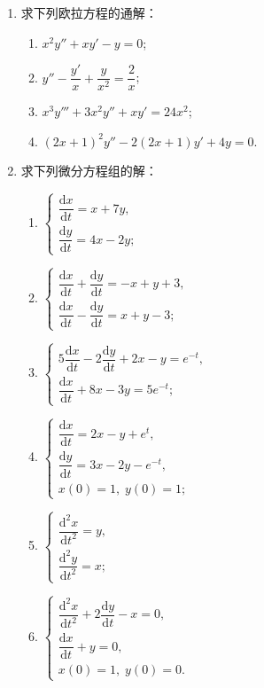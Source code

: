 \begin{enumerate}\setlength{\itemsep}{7pt}
    \item 求下列欧拉方程的通解：
    \begin{enumerate}[(1)]\setlength{\itemsep}{5pt}\setlength{\topsep}{15pt}
        \item $x^2y''+xy'-y=0$;
        \item $y''-\dfrac{y'}{x}+\dfrac{y}{x^2}=\dfrac{2}{x}$;
        \item $x^3y'''+3x^2y''+xy'=24x^2$;
        \item $(2x+1)^2y''-2(2x+1)y'+4y=0$.
    \end{enumerate}

    \item 求下列微分方程组的解：
    \begin{enumerate}[(1)]\setlength{\itemsep}{5pt}\setlength{\topsep}{15pt}
        \item $\begin{cases}
            \dfrac{\text{d}x}{\text{d}t}=x+7y,\\
            \dfrac{\text{d}y}{\text{d}t}=4x-2y;
        \end{cases}$
        \item $\begin{cases}
            \dfrac{\text{d}x}{\text{d}t}+\dfrac{\text{d}y}{\text{d}t}=-x+y+3,\\
            \dfrac{\text{d}x}{\text{d}t}-\dfrac{\text{d}y}{\text{d}t}=x+y-3;
        \end{cases}$
        \item $\begin{cases}
            5\dfrac{\text{d}x}{\text{d}t}-2\dfrac{\text{d}y}{\text{d}t}+2x-y=e^{-t},\\
            \dfrac{\text{d}x}{\text{d}t}+8x-3y=5e^{-t};
        \end{cases}$
        \item $\begin{cases}
            \dfrac{\text{d}x}{\text{d}t}=2x-y+e^t,\\
            \dfrac{\text{d}y}{\text{d}t}=3x-2y-e^{-t},\\
            x(0)=1,\;y(0)=1;
        \end{cases}$
        \item $\begin{cases}
            \dfrac{\text{d}^2x}{\text{d}t^2}=y,\\
            \dfrac{\text{d}^2y}{\text{d}t^2}=x;
        \end{cases}$
        \item $\begin{cases}
            \dfrac{\text{d}^2x}{\text{d}t^2}+2\dfrac{\text{d}y}{\text{d}t}-x=0,\\
            \dfrac{\text{d}x}{\text{d}t}+y=0,\\
            x(0)=1,\;y(0)=0.
        \end{cases}$
    \end{enumerate}


\end{enumerate}

